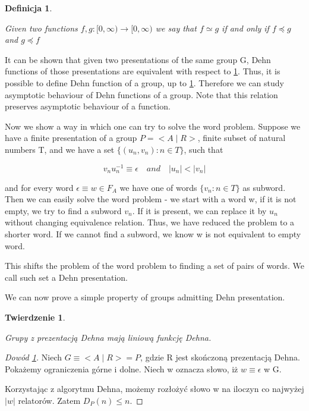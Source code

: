 \documentclass[licencjacka]{pracamgr}
\newtheorem{defi}{Definicja}[section]
\newtheorem{ther}{Twierdzenie}[section]
\begin{document}
\begin{defi}\label{equivalence relation}

Given two functions $f, g : [0, \infty) \rightarrow [0, \infty) $ we say that $f \simeq g$ if and only if $f \preceq g$ and $g \preceq f$

\end{defi}

It can be shown that given two presentations of the same group G, Dehn functions of those presentations are equivalent with respect to \ref{equivalence relation}. Thus, it is possible to define Dehn function of a group, up to \ref{equivalence relation}. Therefore we can study asymptotic behaviour of Dehn functions of a group. Note that this relation preserves asymptotic behaviour of a function.

Now we show a way in which one can try to solve the word problem. Suppose we have a finite presentation of a group $P = < A \mid R>$, finite subset of natural numbers T, and we have a set $\{ (u_{n}, v_{n}) : n \in T \}$, such that

\[ v_{n}u_{n}^{-1} \equiv \epsilon \quad and \quad | u_{n} | < | v_{n} | \]

and for every word $\epsilon \equiv w \in F_{A}$ we have one of words $\{ v_{n} : n \in T \}$ as subword. Then we can easily solve the word problem - we start with a word w, if it is not empty, we try to find a subword $v_{n}$. If it is present, we can replace it by $u_{n}$ without changing equivalence relation. Thus, we have reduced the problem to a shorter word. If we cannot find a subword, we know w is not equivalent to empty word.

This shifts the problem of the word problem to finding a set of pairs of words. We call such set a Dehn presentation.

We can now prove a simple property of groups admitting Dehn presentation.

\begin{ther}\label{thm:dehn_pres_linear}

Grupy z prezentacją Dehna mają liniową funkcję Dehna.

\end{ther}

\begin{proof}[Dowód \ref{thm:dehn_pres_linear}]

Niech $G \equiv <A \mid R> = P$, gdzie R jest skończoną prezentacją Dehna.
Pokażemy ograniczenia górne i dolne. Niech w oznacza słowo, iż $w \equiv \epsilon$ w G.

Korzystając z algorytmu Dehna, możemy rozłożyć słowo w na iloczyn co najwyżej $|w|$ relatorów. Zatem $D_{P}(n) \leq n$.

\end{proof}
\end{document}
